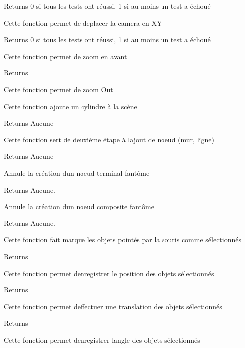 \begin{DoxyReturn}{Returns}
0 si tous les tests ont réussi, 1 si au moins un test a échoué
\end{DoxyReturn}
Cette fonction permet de deplacer la camera en X\+Y

\begin{DoxyReturn}{Returns}
0 si tous les tests ont réussi, 1 si au moins un test a échoué
\end{DoxyReturn}
Cette fonction permet de zoom en avant

\begin{DoxyReturn}{Returns}

\end{DoxyReturn}
Cette fonction permet de zoom Out

Cette fonction ajoute un cylindre à la scène

\begin{DoxyReturn}{Returns}
Aucune
\end{DoxyReturn}
Cette fonction sert de deuxième étape à l\textquotesingle{}ajout de noeud (mur, ligne)

\begin{DoxyReturn}{Returns}
Aucune
\end{DoxyReturn}
Annule la création d\textquotesingle{}un noeud terminal fantôme

\begin{DoxyReturn}{Returns}
Aucune.
\end{DoxyReturn}
Annule la création d\textquotesingle{}un noeud composite fantôme

\begin{DoxyReturn}{Returns}
Aucune.
\end{DoxyReturn}
Cette fonction fait marque les objets pointés par la souris comme sélectionnés

\begin{DoxyReturn}{Returns}

\end{DoxyReturn}
Cette fonction permet d\textquotesingle{}enregistrer le position des objets sélectionnés

\begin{DoxyReturn}{Returns}

\end{DoxyReturn}
Cette fonction permet d\textquotesingle{}effectuer une translation des objets sélectionnés

\begin{DoxyReturn}{Returns}

\end{DoxyReturn}
Cette fonction permet d\textquotesingle{}enregistrer l\textquotesingle{}angle des objets sélectionnés

